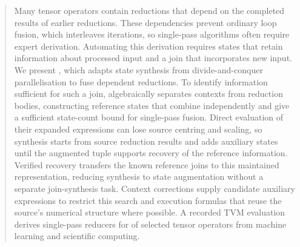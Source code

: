 \begin{abstract}
Many tensor operators contain reductions that depend on the completed results of earlier reductions.
These dependencies prevent ordinary loop fusion, which interleaves iterations, so single-pass algorithms often require expert derivation.
Automating this derivation requires states that retain information about processed input and a join that incorporates new input.
We present \sys, which adapts state synthesis from divide-and-conquer parallelisation to fuse dependent reductions.
To identify information sufficient for such a join, \sys algebraically separates contexts from reduction bodies, constructing reference states that combine independently and give a sufficient state-count bound for single-pass fusion.
Direct evaluation of their expanded expressions can lose source centring and scaling, so synthesis starts from source reduction results and adds auxiliary states until the augmented tuple supports recovery of the reference information.
Verified recovery transfers the known reference joins to this maintained representation, reducing synthesis to state augmentation without a separate join-synthesis task.
Context corrections supply candidate auxiliary expressions to restrict this search and execution formulas that reuse the source's numerical structure where possible.
A recorded TVM evaluation derives single-pass reducers for \nShowFused of \nShowcase selected tensor operators from machine learning and scientific computing.
\end{abstract}
